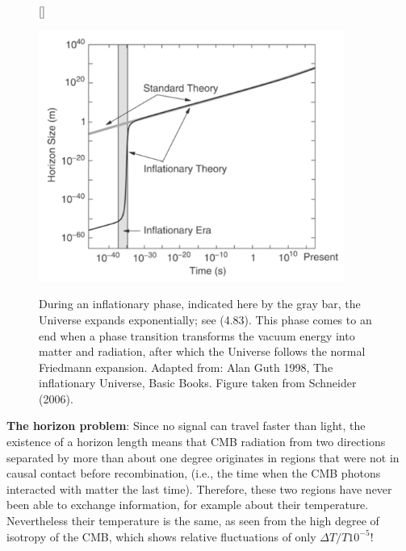 \documentclass[a4paper,11pt]{article}
\begin{document}
\begin{figure}[h]
    [\FBwidth]
    {\caption{\footnotesize{During an inflationary phase, indicated here by the gray bar, the Universe expands exponentially; see (4.83). This phase comes to an end when a phase transition transforms the vacuum energy into matter and radiation, after which the Universe follows the normal Friedmann expansion. Adapted from: Alan Guth 1998, The inflationary Universe, Basic Books. Figure taken from Schneider (2006).}}
    \label{fig:inflation}}
    {\includegraphics[width=10cm]{figures/Inflation.png}}
\end{figure}

{\noindent}\textbf{The horizon problem}: Since no signal can travel faster than light, the existence of a horizon length means that CMB radiation from two directions separated by more than about one degree originates in regions that were not in causal contact before recombination, (i.e., the time when the CMB photons interacted with matter the last time). Therefore, these two regions have never been able to exchange information, for example about their temperature. Nevertheless their temperature is the same, as seen from the high degree of isotropy of the CMB, which shows relative fluctuations of only $\Delta T/T10^{-5}$!
\end{document}
